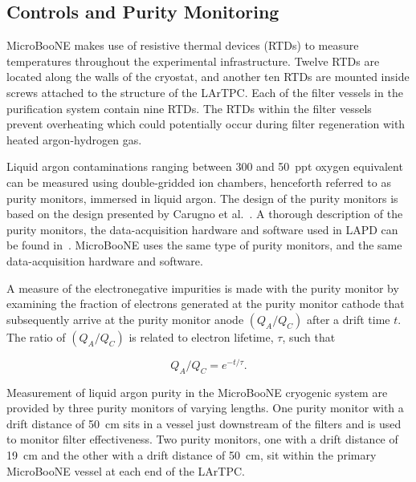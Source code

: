 \subsection{Controls and Purity Monitoring}

MicroBooNE makes use of resistive thermal devices (RTDs) to measure temperatures throughout the experimental infrastructure. Twelve RTDs are located along the walls of the cryostat, and another ten RTDs are mounted inside screws attached to the structure of the LArTPC. Each of the filter vessels in the purification system contain nine RTDs. The RTDs within the filter vessels prevent overheating which could potentially occur during filter regeneration with heated argon-hydrogen gas.

Liquid argon contaminations ranging between 300 and 50~ppt oxygen equivalent can be measured using double-gridded ion chambers, henceforth referred to as purity monitors, immersed in liquid argon. The design of the purity monitors is based on the design presented by Carugno et al.~\cite{Carugno:1990-purityMonitor}.  A thorough description of the purity monitors, the data-acquisition hardware and software used in LAPD can be found in~\cite{Adamowski:2014-LAPD}. MicroBooNE uses the same type of purity monitors, and the same data-acquisition hardware and software. 

A measure of the electronegative impurities is made with the purity monitor by examining the fraction of electrons generated at the purity monitor cathode that subsequently arrive at the purity monitor anode $(Q_A/Q_C)$ after a drift time $t$. The ratio of $(Q_A/Q_C)$ is related to electron lifetime, $\tau$, such that

\begin{equation}
Q_A/Q_C = e^{-t/\tau}.
\end{equation}

Measurement of liquid argon purity in the MicroBooNE cryogenic system are provided by three purity monitors of varying lengths. One purity monitor with a drift distance of 50~cm sits in a vessel just downstream of the filters and is used to monitor filter effectiveness. Two purity monitors, one with a drift distance of 19~cm and the other with a drift distance of 50~cm, sit within the primary MicroBooNE vessel at each end of the LArTPC.


 

